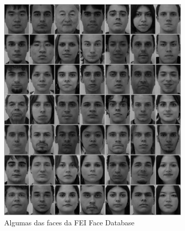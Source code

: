 \begin{figure}[htbp]
    \centering
    \caption{Eigenfaces}
    \label{fig:eigenfaces_faces}
    \begin{subfigure}[t]{0.3\textwidth}
    \centering
    \includegraphics[width=\textwidth]{imagens/faces_fei.jpg}
    \caption{Algumas das faces da FEI Face Database}
    \end{subfigure}
    \begin{subfigure}[t]{0.3\textwidth}
    \centering

\end{subfigure}
\end{figure}

